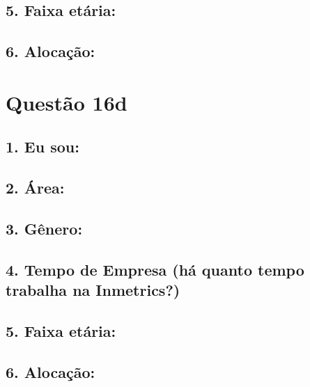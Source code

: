 \documentclass[]{book}
\begin{document}
\hypertarget{faixa-etaria-31}{%
\subsection{5. Faixa etária:}\label{faixa-etaria-31}}

\hypertarget{alocacao-31}{%
\subsection{6. Alocação:}\label{alocacao-31}}

\hypertarget{questao-16d}{%
\section{Questão 16d}\label{questao-16d}}

\hypertarget{eu-sou-32}{%
\subsection{1. Eu sou:}\label{eu-sou-32}}

\hypertarget{area-32}{%
\subsection{2. Área:}\label{area-32}}

\hypertarget{genero-32}{%
\subsection{3. Gênero:}\label{genero-32}}

\hypertarget{tempo-de-empresa-ha-quanto-tempo-trabalha-na-inmetrics-32}{%
\subsection{4. Tempo de Empresa (há quanto tempo trabalha na Inmetrics?)}\label{tempo-de-empresa-ha-quanto-tempo-trabalha-na-inmetrics-32}}

\hypertarget{faixa-etaria-32}{%
\subsection{5. Faixa etária:}\label{faixa-etaria-32}}

\hypertarget{alocacao-32}{%
\subsection{6. Alocação:}\label{alocacao-32}}
\end{document}
